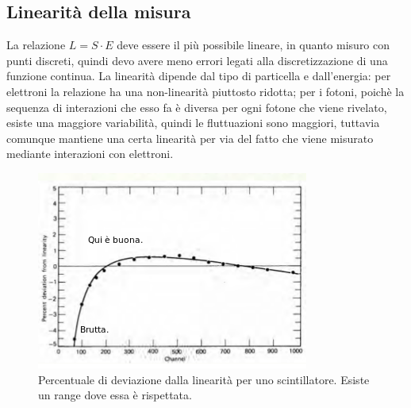 \subsection{Linearit\`a della misura}
La relazione $L = S \cdot E$ deve essere il pi\`u possibile lineare, in quanto misuro con punti discreti, quindi devo
avere meno errori legati alla discretizzazione di una funzione continua.
La linearit\`a dipende dal tipo di particella e dall'energia: per elettroni la relazione ha una non-linearit\`a piuttosto ridotta;
per i fotoni, poich\`e la sequenza di interazioni che esso fa \`e diversa per ogni fotone che viene rivelato, esiste una maggiore
variabilit\`a, quindi le fluttuazioni sono maggiori, tuttavia comunque mantiene una certa linearit\`a per via del fatto che viene
misurato mediante interazioni con elettroni.
\begin{figure}[htbp]
\begin{center}
\includegraphics[scale=1.00]{./Immagini/LinearitaScintillatore.png}
\caption{Percentuale di deviazione dalla linearit\`a per uno scintillatore. Esiste un range dove essa \`e rispettata.}
\end{center}
\end{figure}
